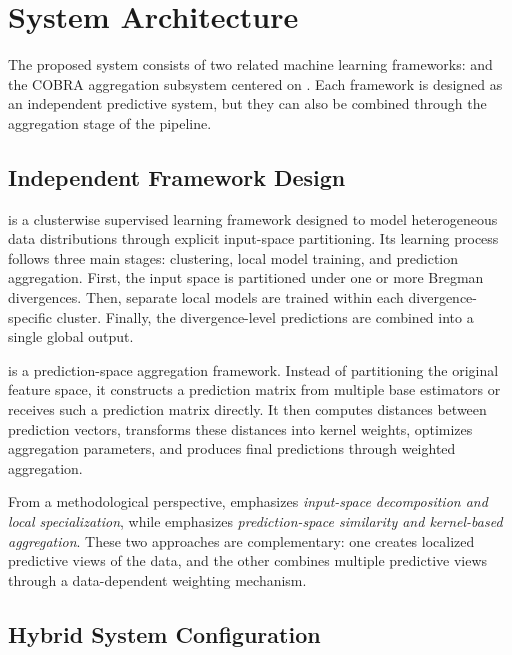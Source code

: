 
\section{System Architecture}
\label{sec:system_architecture}

\hs The proposed system consists of two related machine learning frameworks: \KFCProcedure{} and the COBRA aggregation subsystem centered on \GradientCOBRA{}. Each framework is designed as an independent predictive system, but they can also be combined through the aggregation stage of the \KFCProcedure{} pipeline.

\subsection{Independent Framework Design}

\hs \KFCProcedure{} is a clusterwise supervised learning framework designed to model heterogeneous data distributions through explicit input-space partitioning. Its learning process follows three main stages: clustering, local model training, and prediction aggregation. First, the input space is partitioned under one or more Bregman divergences. Then, separate local models are trained within each divergence-specific cluster. Finally, the divergence-level predictions are combined into a single global output.

\GradientCOBRA{} is a prediction-space aggregation framework. Instead of partitioning the original feature space, it constructs a prediction matrix from multiple base estimators or receives such a prediction matrix directly. It then computes distances between prediction vectors, transforms these distances into kernel weights, optimizes aggregation parameters, and produces final predictions through weighted aggregation.

From a methodological perspective, \KFCProcedure{} emphasizes \textit{input-space decomposition and local specialization}, while \GradientCOBRA{} emphasizes \textit{prediction-space similarity and kernel-based aggregation}. These two approaches are complementary: one creates localized predictive views of the data, and the other combines multiple predictive views through a data-dependent weighting mechanism.

\subsection{Hybrid System Configuration}

